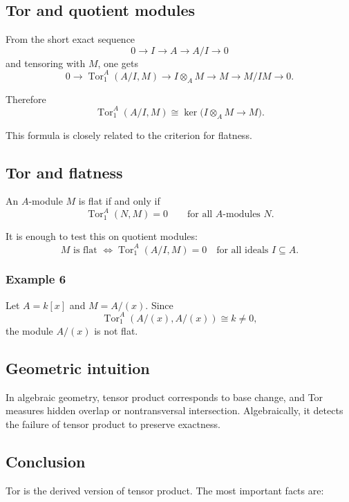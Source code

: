 \documentclass[12pt,a4paper]{article}
\theoremstyle{notespace}
\begin{document}
\subsection{Tor and quotient modules}

From the short exact sequence
\[
0\longrightarrow I \longrightarrow A \longrightarrow A/I \longrightarrow 0
\]
and tensoring with \(M\), one gets
\[
0\to \operatorname{Tor}_1^A(A/I,M)\to I\otimes_A M \to M \to M/IM \to 0.
\]

Therefore
\[
\operatorname{Tor}_1^A(A/I,M)
\cong
\ker\big(I\otimes_A M\to M\big).
\]

This formula is closely related to the criterion for flatness.

\subsection{Tor and flatness}

An \(A\)-module \(M\) is flat if and only if
\[
\operatorname{Tor}_1^A(N,M)=0
\qquad\text{for all }A\text{-modules }N.
\]

It is enough to test this on quotient modules:
\[
M\text{ is flat }
\Longleftrightarrow
\operatorname{Tor}_1^A(A/I,M)=0
\quad\text{for all ideals }I\subseteq A.
\]

\subsubsection*{Example 6}
Let \(A=k[x]\) and \(M=A/(x)\). Since
\[
\operatorname{Tor}_1^A(A/(x),A/(x))\cong k\neq 0,
\]
the module \(A/(x)\) is not flat.

\subsection{Geometric intuition}

In algebraic geometry, tensor product corresponds to base change, and Tor measures hidden overlap or nontransversal intersection. Algebraically, it detects the failure of tensor product to preserve exactness.

\subsection{Conclusion}

Tor is the derived version of tensor product. The most important facts are:
\end{document}
